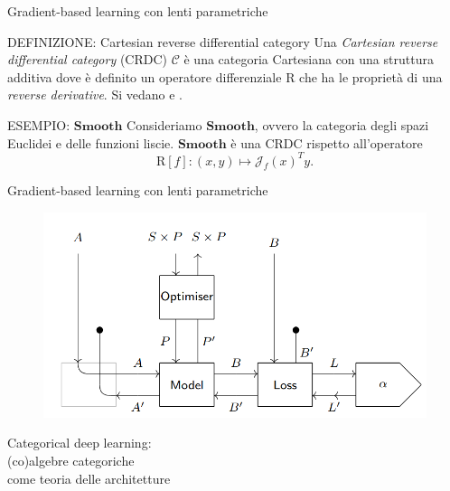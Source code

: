 \documentclass{beamer}
\begin{document}
\begin{frame}{Gradient-based learning con lenti parametriche}
    \begin{block}{DEFINIZIONE: Cartesian reverse differential category}
        Una \textit{Cartesian reverse differential category} (CRDC) $\mathcal{C}$ è una categoria Cartesiana con una struttura additiva dove è definito un operatore differenziale $\mathrm{R}$ che ha le proprietà di una \textit{reverse derivative}.
        Si vedano \cite{cockett2019reverse} e \cite{gavranovic2024fundamental}.
      \end{block}

      \begin{block}{ESEMPIO: $\mathbf{Smooth}$}
        Consideriamo $\mathbf{Smooth}$, ovvero la categoria degli spazi Euclidei e delle funzioni liscie. $\mathbf{Smooth}$ è una CRDC rispetto all'operatore
        \[\mathrm{R}[f]: (x,y) \mapsto \mathcal{J}_f(x)^Ty.\]
      \end{block}
\end{frame}

\begin{frame}{Gradient-based learning con lenti parametriche}
    \begin{figure}
        \begin{center}
            \includegraphics[width=\textwidth]{figures/lenses_supervised_learning2.png}
            \caption*{\cite{cruttwell2022categorical}}
        \end{center}
    \end{figure}
\end{frame}

\begin{frame}[standout]
    \huge Categorical deep learning: \\\large (co)algebre categoriche \\come teoria delle architetture
\end{frame}
\end{document}
